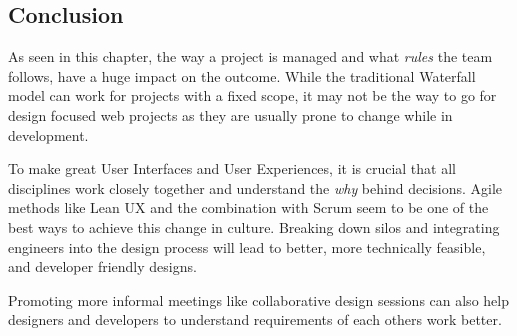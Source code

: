 \newpage
\subsection{Conclusion}

As seen in this chapter, the way a project is managed and what \textit{rules} the team follows, have 
a huge impact on the outcome. While the traditional Waterfall model can work for projects with a
fixed scope, it may not be the way to go for design focused web projects as they are usually prone
to change while in development.

To make great User Interfaces and User Experiences, it is crucial that all disciplines work closely
together and understand the \textit{why} behind decisions. Agile methods like Lean UX and the
combination with Scrum seem to be one of the best ways to achieve this change in culture.
Breaking down silos and integrating engineers into the design process will lead to better, more
technically feasible, and developer friendly designs. 

Promoting more informal meetings like collaborative design sessions can also help designers and
developers to understand requirements of each others work better. 
